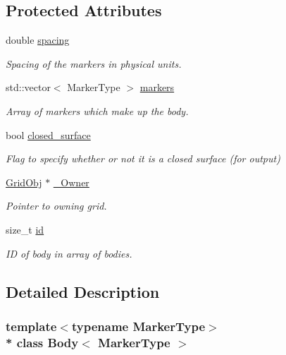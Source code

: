 \subsection*{Protected Attributes}
\begin{DoxyCompactItemize}
\item 
double \hyperlink{class_body_a1d4ac2e6fdbc946d5eab0973fd78770b}{spacing}
\begin{DoxyCompactList}\small\item\em Spacing of the markers in physical units. \end{DoxyCompactList}\item 
std\+::vector$<$ Marker\+Type $>$ \hyperlink{class_body_a4e0ac821f2331ec67793a44e36c855e3}{markers}
\begin{DoxyCompactList}\small\item\em Array of markers which make up the body. \end{DoxyCompactList}\item 
bool \hyperlink{class_body_a2701bdb00789d26ed72d6138d2e21bcb}{closed\+\_\+surface}
\begin{DoxyCompactList}\small\item\em Flag to specify whether or not it is a closed surface (for output) \end{DoxyCompactList}\item 
\hyperlink{class_grid_obj}{Grid\+Obj} $\ast$ \hyperlink{class_body_a5197f31e50222c32adefb795a93d7156}{\+\_\+\+Owner}
\begin{DoxyCompactList}\small\item\em Pointer to owning grid. \end{DoxyCompactList}\item 
size\+\_\+t \hyperlink{class_body_a9d5166d7419f303190b6c6543e67e815}{id}
\begin{DoxyCompactList}\small\item\em ID of body in array of bodies. \end{DoxyCompactList}\end{DoxyCompactItemize}


\subsection{Detailed Description}
\subsubsection*{template$<$typename Marker\+Type$>$\\*
class Body$<$ Marker\+Type $>$}

